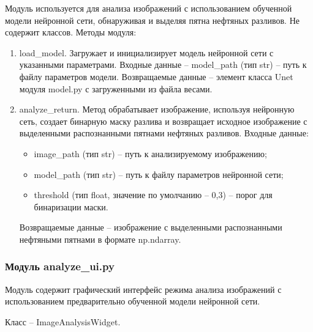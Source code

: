 Модуль используется для анализа изображений с использованием обученной модели нейронной сети, обнаруживая и выделяя пятна нефтяных разливов.  Не содержит классов. Методы модуля:
\begin{enumerate}
	\item load\_model. Загружает и инициализирует модель нейронной сети с указанными параметрами. Входные данные -- model\_path (тип str) -- путь к файлу параметров модели. Возвращаемые данные -- элемент класса Unet модуля model.py с загруженными из файла весами.
	\item analyze\_return. Метод обрабатывает изображение, используя нейронную сеть, создает бинарную маску разлива и возвращает исходное изображение с выделенными распознанными пятнами нефтяных разливов. Входные данные:
	\begin{itemize}
		\item image\_path (тип str) -- путь к анализируемому изображению;
		\item model\_path (тип str) -- путь к файлу параметров нейронной сети;
		\item threshold (тип float, значение по умолчанию -- 0,3) -- порог для бинаризации маски.
	\end{itemize}
	Возвращаемые данные -- изображение с выделенными распознанными нефтяными пятнами в формате np.ndarray.
\end{enumerate}

\subsubsection{Модуль analyze\_ui.py}

Модуль содержит графический интерфейс режима анализа изображений с использованием предварительно обученной модели нейронной сети.

Класс -- ImageAnalysisWidget. 

